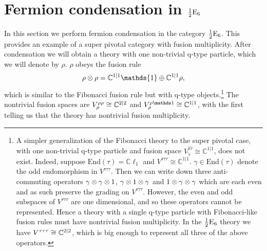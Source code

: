 


\section{Fermion condensation in $\frac{1}{2}\text{E}_6$} \label{halfesix}


In this section we perform fermion condensation in the category $\frac{1}{2}\text{E}_6$.
This provides an example of a super pivotal category with fusion multiplicity.
After condensation we will obtain a theory with one non-trivial q-type particle, 
which we will denote by $\rho$.
$\rho$ obeys the fusion rule
\begin{align}
\rho \tp \rho = \mathbb{C}^{1|1} \mathds{1} \oplus \mathbb{C}^{1|1} \rho,
\end{align}
which is similar to the Fibonacci fusion rule but with q-type objects.\footnote{A simpler generalization of the Fibonacci theory 
to the super pivotal case, with one non-trivial q-type particle and fusion space 
$V^{\tilde{\tau} \tilde{\tau}}_{\tilde {\tau}}\cong \mathbb{C}^{1|1}$, does not exist. 
Indeed, suppose $\text{End}(\tau) = \mathbb{C} \ell_1$ and $V^{\tau \tau \tau} \cong \mathbb{C}^{1|1}$.
$\gamma \in \text{End}(\tau)$ denote the odd endomorphism in $V^{\tau\tau\tau}$.
Then we can write down three anti-commuting operators $\gamma \otimes \gamma \otimes 1$, $\gamma \otimes 1 \otimes \gamma$ and $1\otimes \gamma \otimes \gamma$ 
which are each even and as such preserve the grading on $V^{\tau\tau\tau}$. 
However, the even and odd subspaces of $V^{\tau\tau\tau}$ are one dimensional, and so these operators cannot be represented.
Hence a theory with a single q-type particle with Fibonacci-like fusion rules must have nontrivial fusion multiplicity.
In the $\frac{1}{2}\text{E}_6$ theory we have $V^{\tau\tau\tau} \cong \mathbb{C}^{2|2}$, which is big enough to represent all three of the above operators.}
The nontrivial fusion spaces are $V^{\rho\rho}_\rho \cong \mathbb{C}^{2|2}$ and $V^{\rho\unit}_\rho \cong \cc^{1|1}$, 
with the first telling us that the theory has nontrivial fusion multiplicity. 


